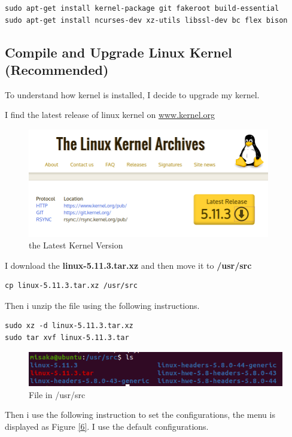\documentclass[UTF8,10pt,a4paper]{article}
\theoremstyle{Problem}
\theoremstyle{Solution}
\begin{document}
\begin{lstlisting}
sudo apt-get install kernel-package git fakeroot build-essential
sudo apt-get install ncurses-dev xz-utils libssl-dev bc flex bison
\end{lstlisting}


\subsection{Compile and Upgrade Linux Kernel (Recommended)}
To understand how kernel is installed, I decide to upgrade my kernel.

I find the latest release of linux kernel on \underline{www.kernel.org}

\begin{figure}[H]
    \centering
    \includegraphics[width=300pt]{4.png}
    \caption{the Latest Kernel Version}
    \label{4}
\end{figure}

I download the \textbf{linux-5.11.3.tar.xz} and then move it to \textbf{/usr/src}

\begin{lstlisting}
cp linux-5.11.3.tar.xz /usr/src
\end{lstlisting}

Then i unzip the file using the following instructions.

\begin{lstlisting}
sudo xz -d linux-5.11.3.tar.xz
sudo tar xvf linux-5.11.3.tar
\end{lstlisting}

\begin{figure}[H]
    \centering
    \includegraphics[width=380pt]{5.png}
    \caption{File in /usr/src}
    \label{5}
\end{figure}

Then i use the following instruction to set the configurations, the menu is displayed as Figure \ref{6}. I use the default configurations.
\end{document}
